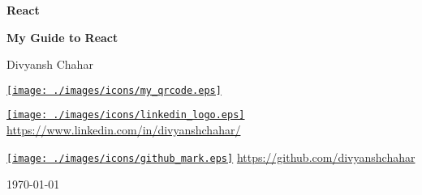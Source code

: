 \documentclass[twoside,12pt]{report}  %
\begin{document}
	\begin{titlepage}
		\begin{center}
			{\LARGE \textbf{React}}\\
			
			\hrulefill
			
			\textbf{My Guide to React} 
			
			\null
			
			Divyansh Chahar
			
			\vfill
			
			\href{https://www.linkedin.com/in/divyanshchahar/}{\texttt{[image: ./images/icons/my\_qrcode.eps]}}
			
			\null
			
			\href{https://www.linkedin.com/in/divyanshchahar/}{\texttt{[image: ./images/icons/linkedin\_logo.eps]}}
			\href{https://www.linkedin.com/in/divyanshchahar/}{https://www.linkedin.com/in/divyanshchahar/}
			
			\null
			
			\href{https://www.linkedin.com/in/divyanshchahar/}{\texttt{[image: ./images/icons/github\_mark.eps]}}
			\href{https://github.com/divyanshchahar}{https://github.com/divyanshchahar}
			
			\vfill
			
			\today
			
		\end{center}
	\end{titlepage}
	
	\restoregeometry
	
	
	
	
	
\end{document}
